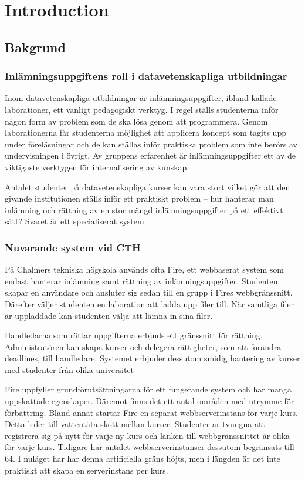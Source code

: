 \chapter{Introduction}

\section{Bakgrund}

\subsection{Inlämningsuppgiftens roll i datavetenskapliga utbildningar}

Inom datavetenskapliga utbildningar är inlämningsuppgifter, ibland kallade
laborationer, ett vanligt pedagogiskt verktyg. I regel ställs studenterna inför
någon form av problem som de ska lösa genom att programmera. Genom
laborationerna får studenterna möjlighet att applicera koncept som tagits upp
under föreläsningar och de kan ställas inför praktiska problem som inte berörs
av undervisningen i övrigt. Av gruppens erfarenhet är inlämningsuppgifter ett av
de viktigaste verktygen för internalisering av kunskap.

Antalet studenter på datavetenskapliga kurser kan vara stort vilket gör att den
givande institutionen ställs inför ett praktiskt problem – hur hanterar man
inlämning och rättning av en stor mängd inlämningsuppgifter på ett effektivt
sätt?
Svaret är ett specialiserat system.

\subsection{Nuvarande system vid CTH}

På Chalmers tekniska högskola används ofta Fire, ett webbaserat system som
endast hanterar inlämning samt rättning av inlämningsuppgifter.
Studenten skapar en användare och ansluter sig sedan till en grupp i Fires
webbgränssnitt. Därefter väljer studenten en laboration att ladda upp filer
till. När samtliga filer är uppladdade kan studenten välja att lämna in sina
filer. 

Handledarna som rättar uppgifterna erbjuds ett gränssnitt för rättning.
Administratören kan skapa kurser och delegera rättigheter, som att förändra
deadlines, till handledare. Systemet erbjuder dessutom smidig hantering av
kurser med studenter från olika universitet

Fire uppfyller grundförutsättningarna för ett fungerande system och har många
uppskattade egenskaper.
Däremot finns det ett antal områden med utrymme för förbättring. Bland annat
startar Fire en separat webbserverinstans för varje kurs. Detta leder till
vattentäta skott mellan kurser. Studenter är tvungna att registrera sig på nytt
för varje ny kurs och länken till webbgränssnittet är olika för varje kurs.
Tidigare har antalet webbserverinstanser dessutom begränsats till 64. I nuläget
har har denna artificiella gräns höjts, men i längden är det inte praktiskt att
skapa en serverinstans per kurs.

